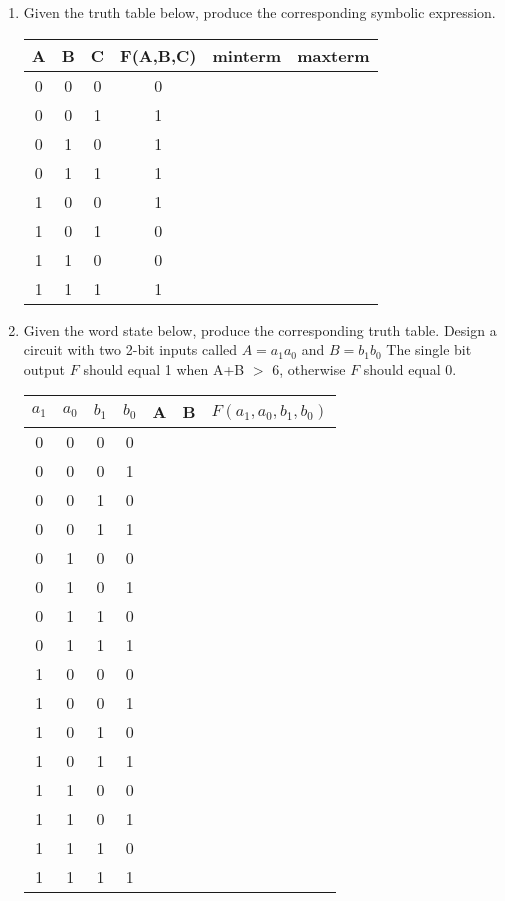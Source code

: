 \begin{enumerate}
\item Given the truth table below, produce the corresponding symbolic expression.

\begin{tabular}{c|c|c||c|c|c}
A & B & C & F(A,B,C)	& minterm & maxterm	\\ \hline
0 & 0 & 0 & 0		&		& 	\\ \hline
0 & 0 & 1 & 1		& 		&	\\ \hline
0 & 1 & 0 & 1		& 		&	\\ \hline
0 & 1 & 1 & 1		& 		&	\\ \hline
1 & 0 & 0 & 1		& 		&	\\ \hline
1 & 0 & 1 & 0		& 		&	\\ \hline
1 & 1 & 0 & 0		& 		&	\\ \hline
1 & 1 & 1 & 1		& 		&	\\ 
\end{tabular}
\vspace{1cm}

\item Given the word state below, produce the corresponding truth table.
Design a circuit with two 2-bit inputs called $A = a_1 a_0$ and  $B = b_1 b_0$
The single bit output $F$ should equal 1 when A+B $>$ 6, otherwise $F$ 
should equal 0.

\begin{tabular}{c|c|c|c||c|c||c}
$a_1$ & $a_0$ & $b_1$ & $b_0$ & A  & B & $F(a_1, a_0, b_1, b_0)$ 	\\ \hline
0 & 0 & 0 & 0 &  &  &   \\ \hline
0 & 0 & 0 & 1 &  &  &   \\ \hline
0 & 0 & 1 & 0 &  &  &   \\ \hline
0 & 0 & 1 & 1 &  &  &   \\ \hline
0 & 1 & 0 & 0 &  &  &   \\ \hline
0 & 1 & 0 & 1 &  &  &   \\ \hline
0 & 1 & 1 & 0 &  &  &   \\ \hline
0 & 1 & 1 & 1 &  &  &   \\ \hline
1 & 0 & 0 & 0 &  &  &   \\ \hline
1 & 0 & 0 & 1 &  &  &   \\ \hline
1 & 0 & 1 & 0 &  &  &   \\ \hline
1 & 0 & 1 & 1 &  &  &   \\ \hline
1 & 1 & 0 & 0 &  &  &   \\ \hline
1 & 1 & 0 & 1 &  &  &   \\ \hline
1 & 1 & 1 & 0 &  &  &   \\ \hline
1 & 1 & 1 & 1 &  &  &   \\ 
\end{tabular}


\end{enumerate}

